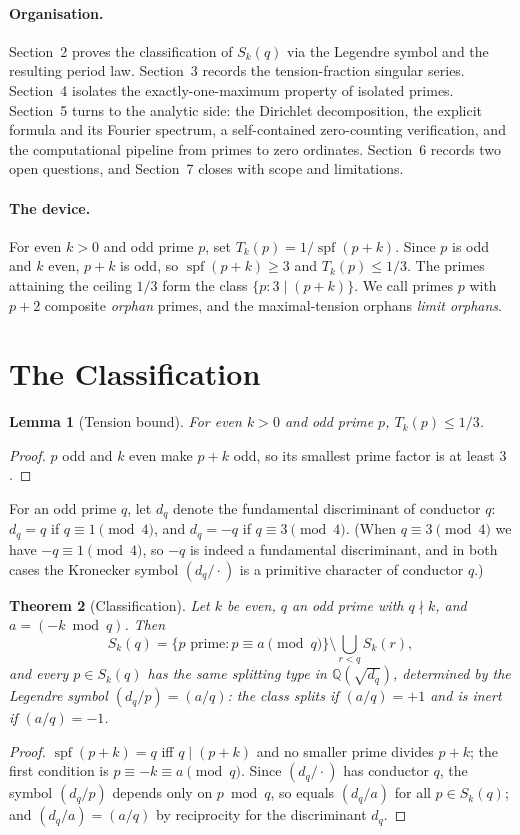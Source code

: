 \documentclass[11pt]{article}
\theoremstyle{plain}
\newtheorem{theorem}{Theorem}
\newtheorem{lemma}[theorem]{Lemma}
\theoremstyle{definition}
\theoremstyle{remark}
\newcommand{\spf}{\operatorname{spf}}
\newcommand{\Q}{\mathbb{Q}}
\begin{document}
\paragraph{Organisation.}
Section~2 proves the classification of $S_k(q)$ via the Legendre symbol and the
resulting period law. Section~3 records the tension-fraction singular series.
Section~4 isolates the exactly-one-maximum property of isolated primes.
Section~5 turns to the analytic side: the Dirichlet decomposition, the explicit
formula and its Fourier spectrum, a self-contained zero-counting verification,
and the computational pipeline from primes to zero ordinates. Section~6 records
two open questions, and Section~7 closes with scope and limitations.

\paragraph{The device.}
For even $k>0$ and odd prime $p$, set $T_k(p) = 1/\spf(p+k)$. Since $p$ is odd and
$k$ even, $p+k$ is odd, so $\spf(p+k)\ge 3$ and $T_k(p)\le 1/3$. The primes
attaining the ceiling $1/3$ form the class $\{p : 3\mid(p+k)\}$. We call primes
$p$ with $p+2$ composite \emph{orphan} primes, and the maximal-tension orphans
\emph{limit orphans}.

\section{The Classification}

\begin{lemma}[Tension bound]\label{lem:bound}
For even $k>0$ and odd prime $p$, $T_k(p)\le 1/3$.
\end{lemma}
\begin{proof}
$p$ odd and $k$ even make $p+k$ odd, so its smallest prime factor is at least $3$.
\end{proof}

For an odd prime $q$, let $d_q$ denote the fundamental discriminant of conductor
$q$: $d_q=q$ if $q\equiv 1\pmod 4$, and $d_q=-q$ if $q\equiv 3\pmod 4$. (When
$q\equiv 3\pmod 4$ we have $-q\equiv 1\pmod 4$, so $-q$ is indeed a fundamental
discriminant, and in both cases the Kronecker symbol $(d_q/\cdot)$ is a primitive
character of conductor $q$.)

\begin{theorem}[Classification]\label{thm:class}
Let $k$ be even, $q$ an odd prime with $q\nmid k$, and $a=(-k\bmod q)$. Then
\[
S_k(q) = \{p \text{ prime}: p\equiv a \pmod q\}\setminus
\bigcup_{r<q}S_k(r),
\]
and every $p\in S_k(q)$ has the same splitting type in $\Q(\sqrt{d_q})$,
determined by the Legendre symbol $(d_q/p)=(a/q)$:
the class \emph{splits} if $(a/q)=+1$ and is \emph{inert} if $(a/q)=-1$.
\end{theorem}
\begin{proof}
$\spf(p+k)=q$ iff $q\mid(p+k)$ and no smaller prime divides $p+k$; the first
condition is $p\equiv -k\equiv a\pmod q$. Since $(d_q/\cdot)$ has conductor $q$,
the symbol $(d_q/p)$ depends only on $p\bmod q$, so equals $(d_q/a)$ for all
$p\in S_k(q)$; and $(d_q/a)=(a/q)$ by reciprocity for the discriminant $d_q$.
\end{proof}
\end{document}
